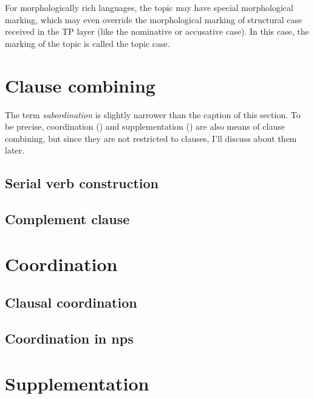 \documentclass[UTF8, a4paper, oneside, scheme=plain]{ctexart}
\newcommand*{\term}[1]{\emph{#1}}
\begin{document}
For morphologically rich languages,
the topic may have special morphological marking,
which may even override the morphological marking of structural case received in the TP layer 
(like the nominative or accusative case).
In this case,
the marking of the topic is called the topic case.

\section{Clause combining}

The term \term{subordination} is slightly narrower than the caption of this section.
To be precise,
coordination () and supplementation () 
are also means of clause combining,
but since they are not restricted to clauses,
I'll discuss about them later.

\subsection{Serial verb construction}

\subsection{Complement clause}\label{sec:complement-clause}

\section{Coordination}\label{sec:coord}

\subsection{Clausal coordination}\label{sec:clause-coord}

\subsection{Coordination in \ac{np}s}

\section{Supplementation}\label{sec:clause-supp}



\end{document}
